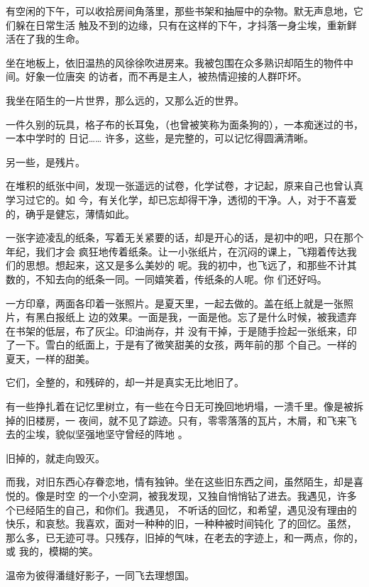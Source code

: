 \documentclass[12pt,a4paper]{article}
\begin{document}
	\endwriting



		有空闲的下午，可以收拾房间角落里，那些书架和抽屉中的杂物。默无声息地，它们躲在日常生活
	触及不到的边缘，只有在这样的下午，才抖落一身尘埃，重新鲜活在了我的生命。

		坐在地板上，依旧温热的风徐徐吹进房来。我被包围在众多熟识却陌生的物件中间。好象一位唐突
	的访者，而不再是主人，被热情迎接的人群吓坏。

		我坐在陌生的一片世界，那么远的，又那么近的世界。

		一件久别的玩具，格子布的长耳兔，（也曾被笑称为面条狗的），一本痴迷过的书，一本中学时的
	日记…… 许多，这些，是完整的，可以记忆得圆满清晰。

		另一些，是残片。

		在堆积的纸张中间，发现一张遥远的试卷，化学试卷，才记起，原来自己也曾认真学习过它的。如
	今，有关化学，却已忘却得干净，透彻的干净。人，对于不喜爱的，确乎是健忘，薄情如此。

		一张字迹凌乱的纸条，写着无关紧要的话，却是开心的话，是初中的吧，只在那个年纪，我们才会
	疯狂地传着纸条。让一小张纸片，在沉闷的课上，飞翔着传达我们的思想。想起来，这又是多么美妙的
	呢。我的初中，也飞远了，和那些不计其数的，不知去向的纸条一同。一同嬉笑着，传纸条的人呢。你
	们还好吗。

		一方印章，两面各印着一张照片。是夏天里，一起去做的。盖在纸上就是一张照片，有黑白报纸上
	边的效果。一面是我，一面是他。忘了是什么时候，被我遗弃在书架的低层，布了灰尘。印油尚存，并
	没有干掉，于是随手捡起一张纸来，印了一下。雪白的纸面上，于是有了微笑甜美的女孩，两年前的那
	个自己。一样的夏天，一样的甜美。

		它们，全整的，和残碎的，却一并是真实无比地旧了。

		有一些挣扎着在记忆里树立，有一些在今日无可挽回地坍塌，一溃千里。像是被拆掉的旧楼房，一
	夜间，就不见了踪迹。只有，零零落落的瓦片，木屑，和飞来飞去的尘埃，貌似坚强地坚守曾经的阵地
	。

		旧掉的，就走向毁灭。

		而我，对旧东西心存眷恋地，情有独钟。坐在这些旧东西之间，虽然陌生，却是喜悦的。像是时空
	的一个小空洞，被我发现，又独自悄悄钻了进去。我遇见，许多个已经陌生的自己，和你们。我遇见，
	不听话的回忆，和希望，遇见没有理由的快乐，和哀愁。我喜欢，面对一种种的旧，一种种被时间钝化
	了的回忆。虽然，那么多，已无迹可寻。只残存，旧掉的气味，在老去的字迹上，和一两点，你的，或
	我的，模糊的笑。

		温帝为彼得潘缝好影子，一同飞去理想国。
\end{document}
